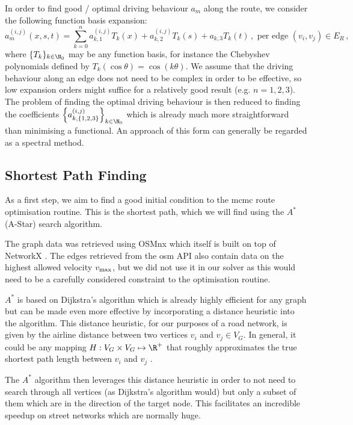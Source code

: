 \documentclass{prettytex/ox/mmsc-special-topic}
\begin{document}
  In order to find good / optimal driving behaviour $a_m$ along the route, we consider the following function basis expansion:
  \begin{equation}
    a_m^{(i,j)}(x, s, t) = \sum_{k=0}^{n} a_{k,1}^{(i,j)} T_k(x) + a_{k,2}^{(i,j)} T_k(s) + a_{k,3} T_k(t)\,, \text{ per edge } (v_i, v_j) \in E_R\,,
    \label{eq:spectral-expansion}
  \end{equation}
  where $\{T_k\}_{k\in \N_0}$ may be any function basis, for instance the Chebyshev polynomials defined by $T_k(\cos \theta) = \cos(k\theta)$.
  We assume that the driving behaviour along an edge does not need to be complex in order to be effective, so low expansion orders might suffice for a relatively good result (e.g. $n = 1, 2, 3$).
  The problem of finding the optimal driving behaviour is then reduced to finding the coefficients $\left\{a_{k,\{1,2,3\}}^{(i,j)}\right\}_{k\in\N_0}$ which is already much more straightforward than minimising a functional.
  An approach of this form can generally be regarded as a spectral method.

  \subsection{Shortest Path Finding}
  As a first step, we aim to find a good initial condition to the \gls{mcmc} route optimisation routine.
  This is the shortest path, which we will find using the $A^*$ (A-Star) search algorithm.

  The graph data was retrieved using OSMnx \parencite{osmnx} which itself is built on top of NetworkX \parencite{networkx}. The edges retrieved from the \glsdesc{osm} API also contain data on the highest allowed velocity $v_{\rm max}$, but we did not use it in our solver as this would need to be a carefully considered constraint to the optimisation routine.

  $A^*$ is based on Dijkstra's algorithm which is already highly efficient for any graph but can be made even more effective by incorporating a distance heuristic into the algorithm.
  This distance heuristic, for our purposes of a road network, is given by the airline distance between two vertices $v_i$ and $v_j \in V_G$.
  In general, it could be any mapping $H: V_G \times V_G \mapsto \R^+$ that roughly approximates the true shortest path length between $v_i$ and $v_j$ \parencite{astar}.

  The $A^*$ algorithm then leverages this distance heuristic in order to not need to search through all vertices (as Dijkstra's algorithm would) but only a subset of them which are in the direction of the target node.
  This facilitates an incredible speedup on street networks which are normally huge.
\end{document}
